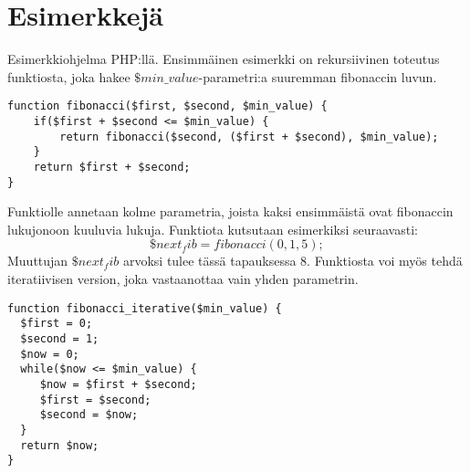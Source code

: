 \section{Esimerkkejä}


\lstset{
	language=FSharp,
	basicstyle=\ttfamily,
	breaklines=true,
	columns=fullflexible
}



\par
Esimerkkiohjelma PHP:llä. Ensimmäinen esimerkki on rekursiivinen toteutus funktiosta, joka hakee $\$min\_value$-parametri:a suuremman fibonaccin luvun. 

\lstset{language=PHP}
\begin{lstlisting}
function fibonacci($first, $second, $min_value) {
    if($first + $second <= $min_value) {
        return fibonacci($second, ($first + $second), $min_value);
    }
    return $first + $second;
}
\end{lstlisting}

Funktiolle annetaan kolme parametria, joista kaksi ensimmäistä ovat fibonaccin lukujonoon kuuluvia lukuja. Funktiota kutsutaan esimerkiksi seuraavasti:
\[ \$next_fib = fibonacci(0, 1, 5); \]
Muuttujan $\$next_fib$ arvoksi tulee tässä tapauksessa 8.
Funktiosta voi myös tehdä iteratiivisen version, joka vastaanottaa vain yhden parametrin.

\begin{lstlisting}
function fibonacci_iterative($min_value) {
  $first = 0;
  $second = 1;
  $now = 0;
  while($now <= $min_value) {
     $now = $first + $second;
     $first = $second;
     $second = $now;
  }
  return $now;
}
\end{lstlisting}
